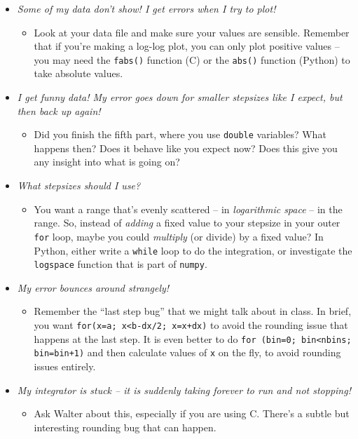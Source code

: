 \documentclass[12pt]{article}
\begin{document}
\begin{itemize}

\item {\it Some of my data don't show! I get errors when I try to plot!}

\begin{itemize}
\item Look at your data file and make sure your values are sensible. Remember that if you're making a log-log plot, you can only plot positive values -- you may need the {\tt fabs()} function (C) or the {\tt abs()} function (Python) to take absolute values.
\end{itemize}

\item {\it I get funny data! My error goes down for smaller stepsizes like I expect, but then back up again!} 

\begin{itemize}
\item Did you finish the fifth part, where you use {\tt double} variables? What happens then? Does it behave like you expect now? Does this give you any insight into what is going on?
\end{itemize}
\item {\it What stepsizes should I use?} 

\begin{itemize}
\item You want a range that's evenly scattered -- in {\it logarithmic space} -- in the range. So, instead of {\it adding} a fixed value to your stepsize in your outer {\tt for} loop, maybe you could {\it multiply} (or divide) by a fixed value? In Python, either write a {\tt while} loop to do the integration, or investigate the {\tt logspace} function that is part of {\tt numpy}.
\end{itemize}
\item {\it My error bounces around strangely!} 

\begin{itemize}
\item Remember the ``last step bug'' that we might talk about in class. In brief, you want {\tt for(x=a; x<b-dx/2; x=x+dx)} to avoid the rounding issue that happens at the last step. It is even better to do {\tt for (bin=0; bin<nbins; bin=bin+1)} and then calculate values of {\tt x} on the fly, to avoid rounding issues entirely.
\end{itemize}

\item {\it My integrator is stuck -- it is suddenly taking forever to run and not stopping!}
\begin{itemize}
	\item Ask Walter about this, especially if you are using C. There's a subtle but interesting rounding bug that can happen.
\end{itemize}
\end{itemize}
\end{document}
